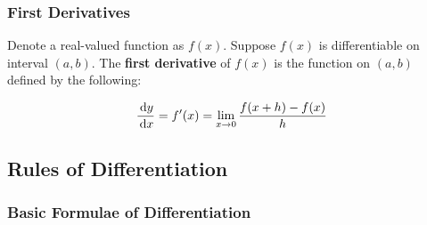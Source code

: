 \documentclass[a4paper,12pt]{article}
\begin{document}
\subsubsection{First Derivatives}
\begin{dft}
  Denote a real-valued function as $f(x)$. Suppose $f(x)$ is differentiable on interval $(a,b)$. The \textbf{first derivative} of $f(x)$ is the function on $(a,b)$ defined by the following:

  $$\frac{\,\mathrm{d} y}{\,\mathrm{d} x}=f'(x)=\lim_{x\to 0}\frac{f(x+h)-f(x)}{h}$$
\end{dft}

\subsection{Rules of Differentiation}
\subsubsection{Basic Formulae of Differentiation}
\end{document}
